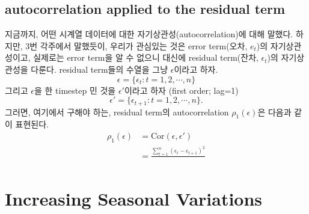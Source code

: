 \documentclass{article}
\begin{document}
\subsection{autocorrelation applied to the residual term}
지금까지, 어떤 시계열 데이터에 대한 자기상관성(autocorrelation)에 대해 말했다.
하지만, 3번 각주에서 말했듯이, 우리가 관심있는 것은 error term(오차, \(e_t\))의 자기상관성이고, 실제로는 error term을 알 수 없으니 대신에 residual term(잔차, \(\epsilon_t\))의 자기상관성을 다룬다.
residual term들의 수열을 그냥 \(\epsilon\)이라고 하자.
\[\epsilon=\{\epsilon_t:t=1,2,\cdots,n\}\]
그리고 \(\epsilon\)을 한 timestep 민 것을 \(\epsilon'\)이라고 하자 (first order; lag=1)
\[\epsilon'=\{\epsilon_{t+1}:t=1,2,\cdots,n\}.\]
그러면, 여기에서 구해야 하는, residual term의 autocorrelation \(\rho_1(\epsilon)\)은  다음과 같이 표현된다.
\begin{align*}
\rho_1(\epsilon)
&=\text{Cor}(\epsilon,\epsilon')\\
&=\frac{\sum_{t=1}^n(\epsilon_t-\epsilon_{t+1})^2}{}
\end{align*}

\section{Increasing Seasonal Variations}
\end{document}
